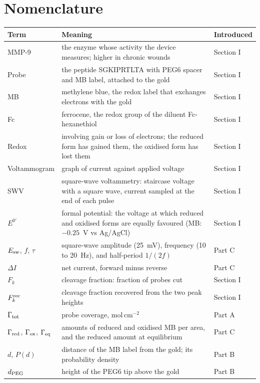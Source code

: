 \documentclass[10pt,a4paper]{article}
\numberwithin{equation}{section}
\newcommand{\DI}{\Delta I}
\newcommand{\Fk}{F_k}
\newcommand{\Fkrec}{F_k^{\rm rec}}
\newcommand{\Grtot}{\Gamma_{\rm tot}}
\newcommand{\Grred}{\Gamma_{\rm red}}
\newcommand{\Grox}{\Gamma_{\rm ox}}
\newcommand{\Greq}{\Gamma_{\rm eq}}
\newcommand{\Esw}{E_{\rm sw}}
\newcommand{\Eform}{E^{0\prime}}
\begin{document}
\section*{Nomenclature}

\begin{center}
\small\renewcommand{\arraystretch}{1.15}
\begin{tabular}{@{}p{2.6cm}p{10.4cm}p{1.6cm}@{}}
\toprule
Term & Meaning & Introduced \\
\midrule
MMP-9 & the enzyme whose activity the device measures; higher in chronic wounds & Section I \\
Probe & the peptide SGKIPRTLTA with PEG6 spacer and MB label, attached to the gold & Section I \\
MB & methylene blue, the redox label that exchanges electrons with the gold & Section I \\
Fc & ferrocene, the redox group of the diluent Fc-hexanethiol & Section I \\
Redox & involving gain or loss of electrons; the reduced form has gained them, the oxidised form has lost them & Section I \\
Voltammogram & graph of current against applied voltage & Section I \\
SWV & square-wave voltammetry: staircase voltage with a square wave, current sampled at the end of each pulse & Section I \\
$\Eform$ & formal potential: the voltage at which reduced and oxidised forms are equally favoured (MB: $-0.25$~V vs Ag/AgCl) & Section I \\
$\Esw$, $f$, $\tau$ & square-wave amplitude (25~mV), frequency (10 to 20~Hz), and half-period $1/(2f)$ & Part C \\
$\DI$ & net current, forward minus reverse & Part C \\
$\Fk$ & cleavage fraction: fraction of probes cut & Section I \\
$\Fkrec$ & cleavage fraction recovered from the two peak heights & Section I \\
$\Grtot$ & probe coverage, mol\,cm$^{-2}$ & Part A \\
$\Grred$, $\Grox$, $\Greq$ & amounts of reduced and oxidised MB per area, and the reduced amount at equilibrium & Part C \\
$d$, $P(d)$ & distance of the MB label from the gold; its probability density & Part B \\
$d_{\rm PEG}$ & height of the PEG6 tip above the gold & Part B \\

\end{tabular}
\end{center}
\end{document}
